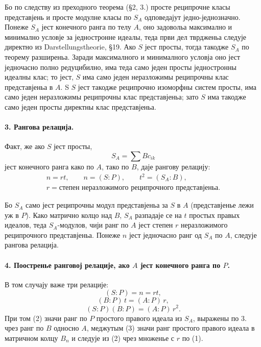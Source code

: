 ﻿\documentclass[11pt]{article}
\newcommand{\foreign}[1]{#1}
\begin{document}
Бо по следству из преходного теорема (§2, 3.) просте реципрочне класы представјень и просте модулне класы по \(S_A\) одповедајут једно-једнозначно. Понеже \(S_A\) јест конечного ранга по телу \(A\), оно задовольа максимално и минимално условје за једностронне идеалы, теда први дел тврдженьа следује директно из \foreign{Darstellungstheorie}, §19. Ако \(S\) јест просты, тогда такодже \(S_A\) по теорему разширеньа. Заради максималного и минималного условја оно јест једночасно полно редуцибилно, има теда само једен просты једностронны идеалны клас; то јест, \(S\) има само једен неразложимы реципрочны клас представјеньа в \(A\). S \(S\) јест такодже реципрочно изоморфны систем просты, има само једен неразложимы реципрочны клас представјеньа; зато \(S\) има такодже само једен просты директны клас представјеньа.

\paragraph{3. Рангова релација.}
Факт, же ако \(S\) јест просты,
\[
        S_A=\sum Bc_{ik}
\]
јест конечного ранга како по \(A\), тако по \(B\), даје рангову релацију:
\[
\begin{gathered}
        n=rt,\qquad n=(S:P),\qquad t^2=(S_A:B),\\
        r=\text{степен неразложимого реципрочного представјеньа}.
\end{gathered}                                                            \tag{1}
\]

Бо \(S_A\) само јест реципрочны модул представјеньа за \(S\) в \(A\) (представјенье лежи уж в \(P\)). Како матрично колцо над \(B\), \(S_A\) разпадаје се на \(t\) простых правых идеалов, теда \(S_A\)-модулов, чији ранг по \(A\) јест степен \(r\) неразложимого реципрочного представјеньа. Понеже \(n\) јест једночасно ранг од \(S_A\) по \(A\), следује рангова релација.

\paragraph{4. Поостренье ранговој релације, ако \(A\) јест конечного ранга по \(P\).}
В том случају важе три релације:
\[
        (S:P)=n=rt,                                                     \tag{1}
\]
\[
        (B:P)\,t=(A:P)\,r,                                               \tag{2}
\]
\[
        (S:P)(B:P)=(A:P)\,r^2.                                           \tag{3}
\]
При том (2) значи ранг по \(P\) простого правого идеала из \(S_A\), выражены по 3. чрез ранг по \(B\) односно \(A\), меджутым (3) значи ранг простого правого идеала в матричном колцу \(B_n\) и следује из (2) чрез множенье с \(r\) по (1).
\end{document}
